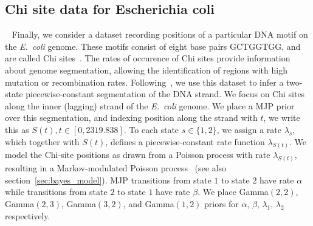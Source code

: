   \subsection{Chi site data for Escherichia coli}~
 \vspace{-.05in}
  Finally, we consider a dataset recording positions of a particular DNA motif on the {\em E.\ coli} genome. 
  These motifs consist of eight base pairs GCTGGTGG, and are called Chi sites~\citep{FearnSher2006}.
  The rates of occurence of Chi sites provide information about genome 
  segmentation, allowing the identification of regions with high 
  mutation or recombination rates.
  Following~\cite{FearnSher2006}, we use this dataset to infer a two-state piecewise-constant segmentation of the DNA strand. 
  We focus on Chi sites along the inner (lagging) strand of the {\em E.\ coli} genome.  
  We place a MJP prior over this segmentation, and indexing position along the 
  strand with $t$, we write this as $S(t), t \in [0,2319.838]$. 
  To each state $s \in \{1,2\}$, we assign a rate $\lambda_s$, which together with $S(t)$, defines a piecewise-constant rate function $\lambda_{S(t)}$. 
  We model the Chi-site positions as drawn from a Poisson process with rate 
  $\lambda_{S(t)}$, resulting in a {Markov-modulated Poisson process}~\citep{scottmmpp03} (see also section~\ref{sec:bayes_model}). 
  MJP transitions from state $1$ to state $2$ have rate $\alpha$ while transitions from state $2$ to state $1$ have rate $\beta$. 
  We place %
  Gamma$(2,2)$, Gamma$(2,3)$, Gamma$(3,2)$, and Gamma$(1,2)$ priors for $\alpha$, $\beta$, $\lambda_1$, $\lambda_2$ respectively.


